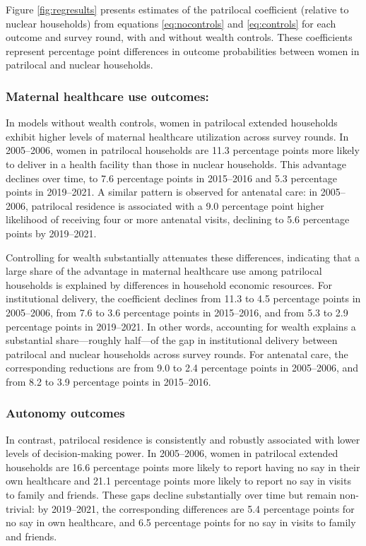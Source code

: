 \documentclass[12pt]{article}
\begin{document}
Figure \ref{fig:regresults} presents estimates of the patrilocal coefficient (relative to nuclear households) from equations \ref{eq:nocontrols} and \ref{eq:controls} for each outcome and survey round, with and without wealth controls. These coefficients represent percentage point differences in outcome probabilities between women in patrilocal and nuclear households.

\subsubsection{ Maternal healthcare use outcomes:}

In models without wealth controls, women in patrilocal extended households exhibit higher levels of maternal healthcare utilization across survey rounds. In 2005–2006, women in patrilocal households are 11.3 percentage points more likely to deliver in a health facility than those in nuclear households. This advantage declines over time, to 7.6 percentage points in 2015–2016 and 5.3 percentage points in 2019–2021. A similar pattern is observed for antenatal care: in 2005–2006, patrilocal residence is associated with a 9.0 percentage point higher likelihood of receiving four or more antenatal visits, declining to 5.6 percentage points by 2019–2021.

Controlling for wealth substantially attenuates these differences, indicating that a large share of the advantage in maternal healthcare use among patrilocal households is explained by differences in household economic resources. For institutional delivery, the coefficient declines from 11.3 to 4.5 percentage points in 2005–2006, from 7.6 to 3.6 percentage points in 2015–2016, and from 5.3 to 2.9 percentage points in 2019–2021. In other words, accounting for wealth explains a substantial share—roughly half—of the gap in institutional delivery between patrilocal and nuclear households across survey rounds. For antenatal care, the corresponding reductions are from 9.0 to 2.4 percentage points in 2005–2006, and from 8.2 to 3.9 percentage points in 2015–2016.

\subsubsection{Autonomy outcomes}

In contrast, patrilocal residence is consistently and robustly associated with lower levels of decision-making power. In 2005–2006, women in patrilocal extended households are 16.6 percentage points more likely to report having no say in their own healthcare and 21.1 percentage points more likely to report no say in visits to family and friends. These gaps decline substantially over time but remain non-trivial: by 2019–2021, the corresponding differences are 5.4 percentage points for no say in own healthcare, and 6.5 percentage points for no say in visits to family and friends. 
\end{document}

